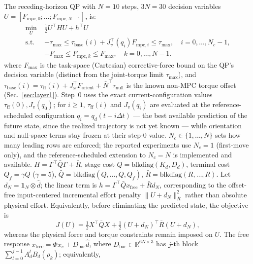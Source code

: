 \documentclass[journal]{IEEEtran}
\newcommand{\Fmpck}[1]{F_{\text{mpc},#1}}
\newcommand{\dhat}{\hat{d}}
\begin{document}
The receding-horizon QP with $N=10$ steps, $3N=30$ decision variables
$U=[\Fmpck{0};\ldots;\Fmpck{N-1}]$, is:
\begin{subequations}\label{eq:QP}
\begin{align}
  \min_U\;& \tfrac{1}{2}U^\top HU+h^\top U \label{eq:QP_cost}\\
  \text{s.t.}\;&
  -\tau_{\max}\leq
  \tau_{\text{base}}(i)+J_v^\top(q_i)\Fmpck{i}
  \leq\tau_{\max}, \quad i=0,\ldots,N_c\!-\!1, \label{eq:QP_torque}\\
  & -F_{\max}\leq\Fmpck{k}\leq F_{\max},
  \quad k=0,\ldots,N-1. \label{eq:QP_force}
\end{align}
\end{subequations}
where $F_{\max}$ is the task-space (Cartesian) corrective-force bound on the
QP's decision variable (distinct from the joint-torque limit $\tau_{\max}$),
and $\tau_{\text{base}}(i)=\tau_{\text{ff}}(i)+J_\omega^\top F_{\text{orient}}+\bar{N}^\top\tau_{\text{null}}$
is the known non-MPC torque offset (Sec.~\ref{sec:layer1}). Step~0 uses the
exact current-configuration values $\tau_{\text{ff}}(0),J_v(q_0)$; for
$i\geq1$, $\tau_{\text{ff}}(i)$ and $J_v(q_i)$ are evaluated at the
reference-scheduled configuration $q_i=q_d(t+i\Delta t)$ --- the best
available prediction of the future state, since the realized trajectory is
not yet known --- while orientation and null-space terms stay frozen at
their step-0 value. $N_c\in\{1,\ldots,N\}$ sets how many leading rows are
enforced; the reported experiments use $N_c=1$ (first-move only), and the
reference-scheduled extension to $N_c=N$ is implemented and available. $H=\Gamma^\top\bar{Q}\Gamma+\bar{R}$, stage cost
$Q=\text{blkdiag}(K_d,D_d)$, terminal cost $Q_f=\gamma Q$ ($\gamma=5$),
$\bar{Q}=\text{blkdiag}(Q,\ldots,Q,Q_f)$,
$\bar{R}=\text{blkdiag}(R,\ldots,R)$.
Let $d_N=\mathbf 1_N\otimes\dhat$; the linear term is
$h=\Gamma^\top\bar{Q}x_{\text{free}}+\bar R d_N$, corresponding to the
offset-free input-centered incremental effort penalty
$\|U+d_N\|_{\bar R}^2$ rather than absolute physical effort.
Equivalently, before eliminating the predicted state, the objective is
\begin{equation}\label{eq:centeredcost}
 J(U)=\tfrac12X^\top\bar QX
 +\tfrac12(U+d_N)^\top\bar R(U+d_N),
\end{equation}
whereas the physical force and torque constraints remain imposed on $U$.
The free response $x_{\text{free}}=\Phi x_e+D_{\text{bar}}\dhat$,
where $D_{\text{bar}}\in\mathbb{R}^{6N\times3}$ has $j$-th block
$\sum_{l=0}^{j-1}A_d^l B_d(\rho_k)$; equivalently,
\end{document}
